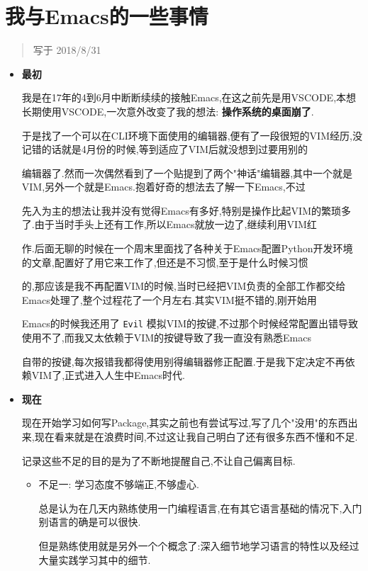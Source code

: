 \documentclass[11pt]{article}
\begin{document}
\section{我与Emacs的一些事情}
\label{sec:org8b6fd27}

\begin{quote}
写于 2018/8/31
\end{quote}

\begin{itemize}
\item \textbf{最初}

我是在17年的4到6月中断断续续的接触Emacs,在这之前先是用VSCODE,本想长期使用VSCODE,一次意外改变了我的想法: \textbf{操作系统的桌面崩了}.

于是找了一个可以在CLI环境下面使用的编辑器,便有了一段很短的VIM经历,没记错的话就是4月份的时候,等到适应了VIM后就没想到过要用别的

编辑器了.然而一次偶然看到了一个贴提到了两个"神话"编辑器,其中一个就是VIM,另外一个就是Emacs.抱着好奇的想法去了解一下Emacs,不过

先入为主的想法让我并没有觉得Emacs有多好,特别是操作比起VIM的繁琐多了.由于当时手头上还有工作,所以Emacs就放一边了,继续利用VIM红

作.后面无聊的时候在一个周末里面找了各种关于Emacs配置Python开发环境的文章,配置好了用它来工作了,但还是不习惯,至于是什么时候习惯

的,那应该是我不再配置VIM的时候,当时已经把VIM负责的全部工作都交给Emacs处理了,整个过程花了一个月左右.其实VIM挺不错的,刚开始用

Emacs的时候我还用了 \texttt{Evil} 模拟VIM的按键,不过那个时候经常配置出错导致使用不了,而我又太依赖于VIM的按键导致了我一直没有熟悉Emacs

自带的按键,每次报错我都得使用别得编辑器修正配置.于是我下定决定不再依赖VIM了,正式进入人生中Emacs时代.

\item \textbf{现在}

现在开始学习如何写Package,其实之前也有尝试写过,写了几个"没用"的东西出来,现在看来就是在浪费时间,不过这让我自己明白了还有很多东西不懂和不足.

记录这些不足的目的是为了不断地提醒自己,不让自己偏离目标.

\begin{itemize}
\item 不足一: 学习态度不够端正,不够虚心.

总是认为在几天内熟练使用一门编程语言,在有其它语言基础的情况下,入门别语言的确是可以很快.

但是熟练使用就是另外一个个概念了:深入细节地学习语言的特性以及经过大量实践学习其中的细节.


\end{itemize}
\end{itemize}
\end{document}

